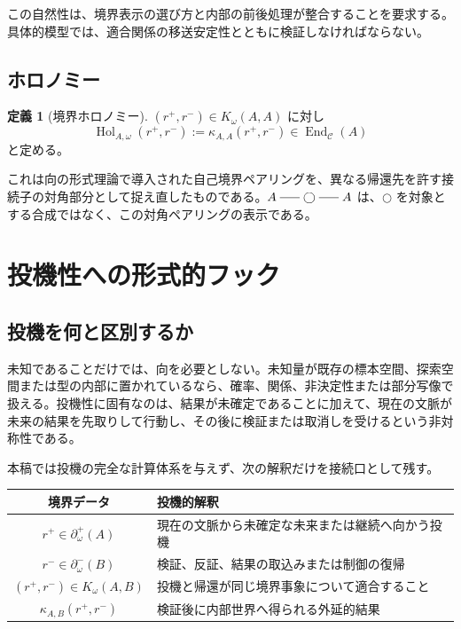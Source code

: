 \documentclass[a4paper,11pt]{ltjsarticle}
\theoremstyle{definition}
\newtheorem{definition}{定義}[section]
\theoremstyle{plain}
\newcommand{\End}{\operatorname{End}}
\newcommand{\Hol}{\operatorname{Hol}}
\newcommand{\dfix}{\bigcirc}
\newcommand{\dline}{\mathrel{\rule[0.55ex]{1.6em}{0.4pt}}}
\begin{document}
この自然性は、境界表示の選び方と内部の前後処理が整合することを要求する。具体的模型では、適合関係の移送安定性とともに検証しなければならない。

\subsection{ホロノミー}

\begin{definition}[境界ホロノミー]
$(r^+,r^-)\in K_\omega(A,A)$ に対し
\[
 \Hol_{A,\omega}(r^+,r^-)
 :=\kappa_{A,A}(r^+,r^-)
 \in\End_{\mathcal C}(A)
\]
と定める。
\end{definition}

これは向の形式理論で導入された自己境界ペアリングを、異なる帰還先を許す接続子の対角部分として捉え直したものである。$A\dline\dfix\dline A$ は、$\dfix$ を対象とする合成ではなく、この対角ペアリングの表示である。

\section{投機性への形式的フック}

\subsection{投機を何と区別するか}

未知であることだけでは、向を必要としない。未知量が既存の標本空間、探索空間または型の内部に置かれているなら、確率、関係、非決定性または部分写像で扱える。投機性に固有なのは、結果が未確定であることに加えて、現在の文脈が未来の結果を先取りして行動し、その後に検証または取消しを受けるという非対称性である。

本稿では投機の完全な計算体系を与えず、次の解釈だけを接続口として残す。
\begin{center}
\begin{tabular}{c p{}}
\toprule
境界データ & 投機的解釈 \\
\midrule
$r^+\in\partial_\omega^+(A)$
 & 現在の文脈から未確定な未来または継続へ向かう投機 \\
$r^-\in\partial_\omega^-(B)$
 & 検証、反証、結果の取込みまたは制御の復帰 \\
$(r^+,r^-)\in K_\omega(A,B)$
 & 投機と帰還が同じ境界事象について適合すること \\
$\kappa_{A,B}(r^+,r^-)$
 & 検証後に内部世界へ得られる外延的結果 \\
\bottomrule
\end{tabular}
\end{center}
\end{document}
